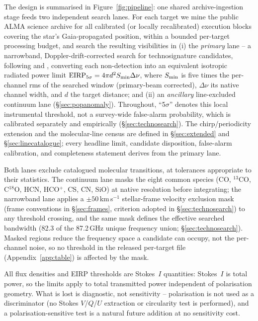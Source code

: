\documentclass{openjournal}
\begin{document}
The design is summarised in Figure~\ref{fig:pipeline}: one shared
archive-ingestion stage feeds two independent search lanes. For each
target we mine the public ALMA science archive for all calibrated (or
locally recalibrated) execution blocks covering the star's
Gaia-propagated position, within a bounded per-target processing
budget, and search the resulting visibilities in (i) the
\emph{primary} lane -- a narrowband, Doppler-drift-corrected search
for technosignature candidates, following \citet{Mason2024} and
\citet{Enriquez2017}, converting each non-detection into an
equivalent isotropic radiated power limit
$\mathrm{EIRP_{5\sigma}} = 4\pi d^{2} S_{\rm min} \Delta\nu$, where
$S_{\rm min}$ is five times the per-channel rms of the searched
window (primary-beam corrected), $\Delta\nu$ its native channel
width, and $d$ the target distance; and (ii) an \emph{ancillary} line-excluded continuum lane
(\S\ref{sec:popanomaly}). Throughout, ``5$\sigma$'' denotes this local
instrumental threshold, not a survey-wide false-alarm probability,
which is calibrated separately and empirically
(\S\ref{sec:technosearch}). The chirp/periodicity extension and the
molecular-line census are defined in \S\ref{sec:extended} and
\S\ref{sec:linecatalogue}; every headline limit, candidate
disposition, false-alarm calibration, and completeness statement
derives from the primary lane.

Both lanes exclude catalogued molecular transitions, at tolerances
appropriate to their statistics. The continuum lane masks the eight
common species (CO, $^{13}$CO, C$^{18}$O, HCN, HCO$^{+}$, CS, CN,
SiO) at native resolution before integrating; the narrowband lane
applies a $\pm50$\,km\,s$^{-1}$ stellar-frame velocity exclusion mask
(frame conventions in \S\ref{sec:frames}, criterion adopted in
\S\ref{sec:technosearch}) to any threshold crossing, and the same mask
defines the effective searched bandwidth (82.3 of the 87.2\,GHz
unique frequency union; \S\ref{sec:technosearch}). Masked regions
reduce the frequency space a candidate can occupy, not the per-channel
noise, so no threshold in the released per-target file (Appendix~\ref{app:table}) is affected by the
mask.

All flux densities and EIRP thresholds are Stokes~$I$ quantities:
Stokes~$I$ is total power, so the limits apply to total transmitted
power independent of polarisation geometry. What is lost is
diagnostic, not sensitivity -- polarisation is not used as a
discriminator (no Stokes $V$/$Q$/$U$ extraction or circularity test
is performed), and a polarisation-sensitive test is a natural future
addition at no sensitivity cost.
\end{document}
